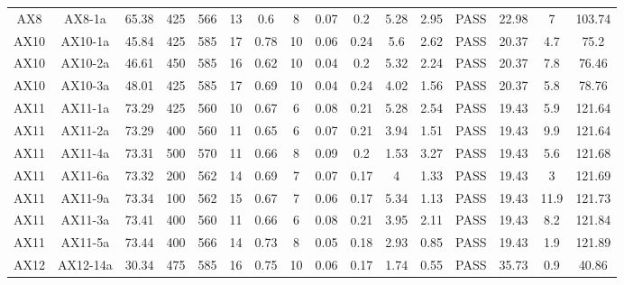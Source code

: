 \documentclass[9pt,twoside,lineno]{pnas-new}
\begin{document}
\begin{table}
\begin{tabular}{cccccccccccccccc}
AX8  & AX8-1a   & 65.38     & 425       & 566       & 13 & 0.6  & 8     & 0.07    & 0.2     & 5.28           & 2.95            & PASS & 22.98         & 7        & 103.74        \\
AX10 & AX10-1a  & 45.84     & 425       & 585       & 17 & 0.78 & 10    & 0.06    & 0.24    & 5.6            & 2.62            & PASS & 20.37         & 4.7      & 75.2          \\
AX10 & AX10-2a  & 46.61     & 450       & 585       & 16 & 0.62 & 10    & 0.04    & 0.2     & 5.32           & 2.24            & PASS & 20.37         & 7.8      & 76.46         \\
AX10 & AX10-3a  & 48.01     & 425       & 585       & 17 & 0.69 & 10    & 0.04    & 0.24    & 4.02           & 1.56            & PASS & 20.37         & 5.8      & 78.76         \\
AX11 & AX11-1a  & 73.29     & 425       & 560       & 10 & 0.67 & 6     & 0.08    & 0.21    & 5.28           & 2.54            & PASS & 19.43         & 5.9      & 121.64        \\
AX11 & AX11-2a  & 73.29     & 400       & 560       & 11 & 0.65 & 6     & 0.07    & 0.21    & 3.94           & 1.51            & PASS & 19.43         & 9.9      & 121.64        \\
AX11 & AX11-4a  & 73.31     & 500       & 570       & 11 & 0.66 & 8     & 0.09    & 0.2     & 1.53           & 3.27            & PASS & 19.43         & 5.6      & 121.68        \\
AX11 & AX11-6a  & 73.32     & 200       & 562       & 14 & 0.69 & 7     & 0.07    & 0.17    & 4              & 1.33            & PASS & 19.43         & 3        & 121.69        \\
AX11 & AX11-9a  & 73.34     & 100       & 562       & 15 & 0.67 & 7     & 0.06    & 0.17    & 5.34           & 1.13            & PASS & 19.43         & 11.9     & 121.73        \\
AX11 & AX11-3a  & 73.41     & 400       & 560       & 11 & 0.66 & 6     & 0.08    & 0.21    & 3.95           & 2.11            & PASS & 19.43         & 8.2      & 121.84        \\
AX11 & AX11-5a  & 73.44     & 400       & 566       & 14 & 0.73 & 8     & 0.05    & 0.18    & 2.93           & 0.85            & PASS & 19.43         & 1.9      & 121.89        \\
AX12 & AX12-14a & 30.34     & 475       & 585       & 16 & 0.75 & 10    & 0.06    & 0.17    & 1.74           & 0.55            & PASS & 35.73         & 0.9      & 40.86         \\

\end{tabular}
\end{table}
\end{document}
